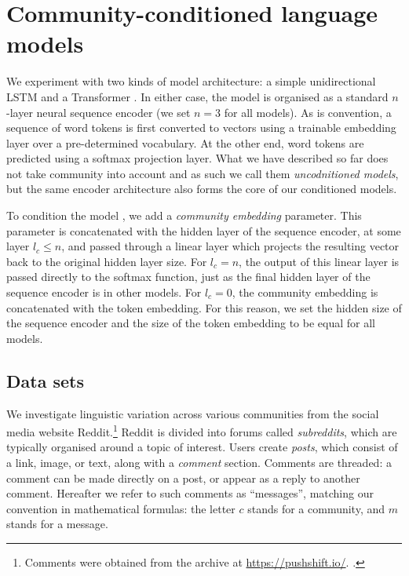 \documentclass[11pt]{article}
\begin{document}
\section{Community-conditioned language models}\label{sec:cclm}

We experiment with two kinds of model architecture: a simple
unidirectional LSTM \citep{Hochreiter1997} and a Transformer
\citep{Vaswani2017}.  In either case, the model is organised as a
standard $n$-layer neural sequence encoder (we set $n=3$ for all
models). As is convention, a sequence of word tokens is first converted to 
vectors using a trainable embedding layer over a pre-determined vocabulary.
At the other end, word tokens are predicted using a softmax projection 
layer. What we have described so far does not take community into account
and as such we call them \emph{uncodnitioned models}, but the same
encoder architecture also forms the core of our conditioned models.

To condition the model , we add a \emph{community embedding} parameter.
This parameter is concatenated with the hidden layer of the
sequence encoder, at some layer $l_c \leq n$, and passed through a
linear layer which projects the resulting vector back to the original
hidden layer size.  For $l_c = n$, the output of this linear layer is
passed directly to the softmax function, just as the final hidden
layer of the sequence encoder is in other models.  For $l_c=0$, the
community embedding is concatenated with the token embedding.  For
this reason, we set the hidden size of the sequence encoder and the
size of the token embedding to be equal for all models.


\subsection{Data sets}

We investigate linguistic variation across various communities 
from the social media website Reddit.\footnote{Comments were obtained
  from the archive at \url{https://pushshift.io/}.
  \cite{Baumgartner2020}.}
%
Reddit is divided into forums called \textit{subreddits}, 
which are typically organised around a topic of interest. 
Users create \textit{posts}, which consist of a link, image, 
or text, along with a \emph{comment} section. 
Comments are threaded: a comment can be made directly on a post,
or appear as a reply to another comment.
%
Hereafter we refer to such comments as ``messages'', matching our
convention in mathematical formulas: the letter $c$ stands for a
community, and $m$ stands for a message.
\end{document}
